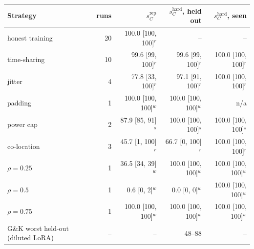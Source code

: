 \begin{tabular}{lrrrr}
\toprule
Strategy & runs & $s_C^{\mathrm{rep}}$ & $s_C^{\mathrm{hard}}$, held out & $s_C^{\mathrm{hard}}$, seen \\
\midrule
honest training & 20 & 100.0 [100, 100]$^r$ & -- & -- \\
time-sharing & 10 & 99.6 [99, 100]$^r$ & 99.6 [99, 100]$^r$ & 100.0 [100, 100]$^r$ \\
jitter & 4 & 77.8 [33, 100]$^r$ & 97.1 [91, 100]$^r$ & 100.0 [100, 100]$^r$ \\
padding & 1 & 100.0 [100, 100]$^w$ & 100.0 [100, 100]$^w$ & n/a \\
power cap & 2 & 87.9 [85, 91]$^s$ & 100.0 [100, 100]$^s$ & 100.0 [100, 100]$^s$ \\
co-location & 3 & 45.7 [1, 100]$^r$ & 66.7 [0, 100]$^r$ & 100.0 [100, 100]$^r$ \\
\quad $\rho = 0.25$ & 1 & 36.5 [34, 39]$^w$ & 100.0 [100, 100]$^w$ & 100.0 [100, 100]$^w$ \\
\quad $\rho = 0.5$ & 1 & 0.6 [0, 2]$^w$ & 0.0 [0, 0]$^w$ & 100.0 [100, 100]$^w$ \\
\quad $\rho = 0.75$ & 1 & 100.0 [100, 100]$^w$ & 100.0 [100, 100]$^w$ & 100.0 [100, 100]$^w$ \\
\midrule
G\&K worst held-out (diluted LoRA) & -- & -- & 48--88 & -- \\
\bottomrule
\end{tabular}
